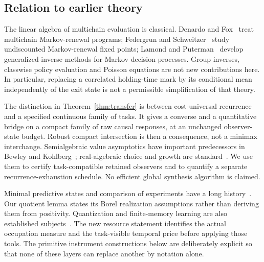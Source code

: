 \subsection*{Relation to earlier theory}
The linear algebra of multichain evaluation is classical. Denardo and Fox~\cite{DenardoFox} treat multichain Markov-renewal programs; Federgrun and Schweitzer~\cite{FedergrunSchweitzer} study undiscounted Markov-renewal fixed points; Lamond and Puterman~\cite{LamondPuterman} develop generalized-inverse methods for Markov decision processes. Group inverses, classwise policy evaluation and Poisson equations are not new contributions here. In particular, replacing a correlated holding-time mark by its conditional mean independently of the exit state is not a permissible simplification of that theory.

The distinction in Theorem~\ref{thm:transfer} is between cost-universal recurrence and a specified continuous family of tasks. It gives a converse and a quantitative bridge on a compact family of raw causal responses, at an unchanged observer-state budget. Robust compact intersection is then a consequence, not a minimax interchange. Semialgebraic value asymptotics have important predecessors in Bewley and Kohlberg~\cite{BewleyKohlberg,BewleyKohlbergStationary}; real-algebraic choice and growth are standard~\cite{BasuPollackRoy}. We use them to certify task-compatible retained observers and to quantify a separate recurrence-exhaustion schedule. No efficient global synthesis algorithm is claimed.

Minimal predictive states and comparison of experiments have a long history~\cite{ShaliziCrutchfield,Blackwell,Fritz}. Our quotient lemma states its Borel realization assumptions rather than deriving them from positivity. Quantization and finite-memory learning are also established subjects~\cite{GrafLuschgy,HellmanCover}. The new resource statement identifies the actual occupation measure and the task-visible temporal price before applying those tools. The primitive instrument constructions below are deliberately explicit so that none of these layers can replace another by notation alone.
